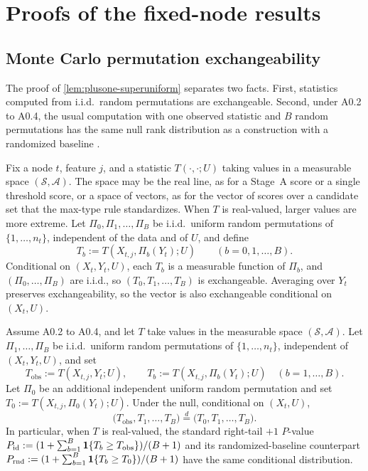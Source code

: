 \section{Proofs of the fixed-node results}
\label{app:permutation-exchangeability}

\subsection{Monte Carlo permutation exchangeability}

The proof of \cref{lem:plusone-superuniform} separates two facts. First,
statistics computed from i.i.d.\ random permutations are exchangeable. Second,
under A0.2 to A0.4, the usual computation with one observed statistic and $B$
random permutations has the same null rank distribution as a construction with
a randomized baseline \citep{HemerikGoeman2018ExactTestingRandomPermutations}.

Fix a node $t$, feature $j$, and a statistic $T(\cdot, \cdot; U)$ taking values
in a measurable space $(\mathcal{S},\mathcal{A})$. The space may be the real
line, as for a Stage~A score or a single threshold score, or a space of
vectors, as for the vector of scores over a candidate set that the max-type rule
standardizes. When $T$ is real-valued, larger values are more extreme. Let
$\Pi_0, \Pi_1, \dots, \Pi_B$ be i.i.d.\ uniform random permutations of
$\{1,\dots,n_t\}$, independent of the data and of $U$, and define
%
\begin{equation}
  T_b := T(X_{t,j}, \Pi_b(Y_t); U) \qquad (b=0,1,\dots,B).
\end{equation}
%
Conditional on $(X_t, Y_t, U)$, each $T_b$ is a measurable function of $\Pi_b$,
and $(\Pi_0,\dots,\Pi_B)$ are i.i.d., so $(T_0, T_1, \dots, T_B)$ is
exchangeable. Averaging over $Y_t$ preserves exchangeability, so the vector is
also exchangeable conditional on $(X_t,U)$.

\begin{lemma}
\label{lem:identity-vs-random}
Assume A0.2 to A0.4, and let $T$ take values in the measurable space
$(\mathcal{S},\mathcal{A})$. Let $\Pi_1,\dots,\Pi_B$ be i.i.d.\ uniform random
permutations of $\{1,\dots,n_t\}$, independent of $(X_t,Y_t,U)$, and set
%
\begin{equation}
  T_{\mathrm{obs}} := T(X_{t,j}, Y_t; U),
  \qquad
  T_b := T(X_{t,j}, \Pi_b(Y_t); U) \quad (b=1,\dots,B).
\end{equation}
%
Let $\Pi_0$ be an additional independent uniform random permutation and set
$T_0 := T(X_{t,j}, \Pi_0(Y_t); U)$. Under the null, conditional on $(X_t,U)$,
%
\begin{equation}
  \big(T_{\mathrm{obs}}, T_1,\dots,T_B\big)
  \stackrel{d}{=}
  \big(T_0, T_1,\dots,T_B\big).
\end{equation}
%
In particular, when $T$ is real-valued, the standard right-tail $+1$ $P$-value
$P_{\mathrm{id}} := (1 + \sum_{b=1}^B \mathbf{1}\{T_b \ge T_{\mathrm{obs}}\})/(B+1)$
and its randomized-baseline counterpart
$P_{\mathrm{rnd}} := (1 + \sum_{b=1}^B \mathbf{1}\{T_b \ge T_0\})/(B+1)$ have the same
conditional distribution.
\end{lemma}

